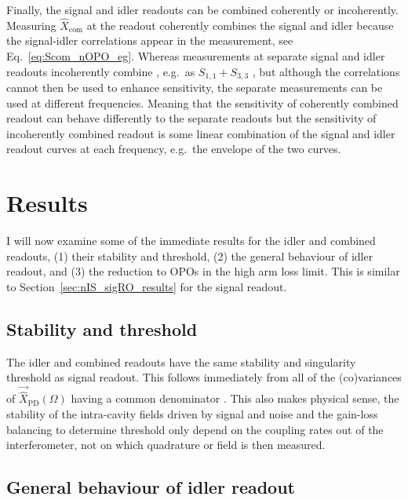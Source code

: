 Finally, the signal and idler readouts can be combined coherently or incoherently. Measuring $\hat{X}_\text{com}$ at the readout coherently combines the signal and idler because the signal-idler correlations appear in the measurement, see Eq.~\ref{eq:Scom_nOPO_eg}. Whereas measurements at separate signal and idler readouts incoherently combine , e.g.\ as $S_{1,1}+S_{3,3}$ , but although the correlations cannot then be used to enhance sensitivity, the separate measurements can be used at different frequencies. Meaning that the sensitivity of coherently combined readout can behave differently to the separate readouts but the sensitivity of incoherently combined readout is some linear combination of the signal and idler readout curves at each frequency, e.g.\ the envelope of the two curves.


\section{Results}

I will now examine some of the immediate results for the idler and combined readouts, (1) their stability and threshold, (2) the general behaviour of idler readout, and (3) the reduction to OPOs in the high arm loss limit. This is similar to Section~\ref{sec:nIS_sigRO_results} for the signal readout.

\subsection{Stability and threshold}

The idler and combined readouts have the same stability and singularity threshold as signal readout. This follows immediately from all of the (co)variances of $\vec{\hat X}_\text{PD}(\Omega)$ having a common denominator . This also makes physical sense, the stability of the intra-cavity fields driven by signal and noise and the gain-loss balancing to determine threshold only depend on the coupling rates out of the interferometer, not on which quadrature or field is then measured.

\subsection{General behaviour of idler readout}

